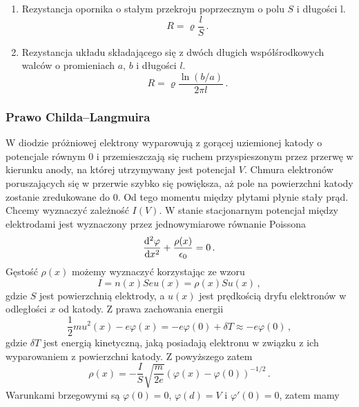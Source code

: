 \documentclass[../main.tex]{subfiles}
\begin{document}
\begin{enumerate}
    \item Rezystancja opornika o stałym przekroju poprzecznym o polu \(S\) i długości l.
    \begin{equation*}
        R=\varrho\frac{l}{S}\,.
    \end{equation*}
    
    \item Rezystancja układu składającego się z dwóch długich współśrodkowych walców o promieniach
    \(a\), \(b\) i długości \(l\).
    \begin{equation*}
        R=\varrho\frac{\ln(b/a)}{2\pi l}\,.
    \end{equation*}

\end{enumerate}
\subsubsection{Prawo Childa--Langmuira}
W diodzie próżniowej elektrony wyparowują z gorącej uziemionej katody o potencjale równym 0 i
przemieszczają się ruchem przyspieszonym przez przerwę w kierunku anody, na której utrzymywany jest
potencjał \(V\). Chmura elektronów poruszających się w przerwie szybko się powiększa, aż pole na
powierzchni katody zostanie zredukowane do 0. Od tego momentu między płytami płynie stały prąd.
Chcemy wyznaczyć zależność \(I(V)\). W stanie stacjonarnym potencjał między elektrodami jest
wyznaczony przez jednowymiarowe równanie Poissona
\begin{equation*}
    \dv[2]{\varphi}{x}+\frac{\rho(x)}{\epsilon_0}=0\,.
\end{equation*}
Gęstość \(\rho(x)\) możemy wyznaczyć korzystając ze wzoru
\begin{equation*}
    I=n(x)Seu(x)=\rho(x)Su(x)\,,
\end{equation*}
gdzie \(S\) jest powierzchnią elektrody, a \(u(x)\) jest prędkością dryfu elektronów w odległości
\(x\) od katody. Z prawa zachowania energii
\begin{equation*}
    \frac{1}{2}mu^2(x)-e\varphi(x)=-e\varphi(0)+\delta T\approx-e\varphi(0)\,,
\end{equation*}
gdzie \(\delta T\) jest energią kinetyczną, jaką posiadają elektronu w związku z ich wyparowaniem z
powierzchni katody. Z powyższego zatem
\begin{equation*}
    \rho(x)=-\frac{I}{S}\sqrt{\frac{m}{2e}}(\varphi(x)-\varphi(0))^{-1/2}\,.
\end{equation*}
Warunkami brzegowymi są \(\varphi(0)=0\), \(\varphi(d)=V\) i \(\varphi'(0)=0\), zatem mamy
\end{document}
